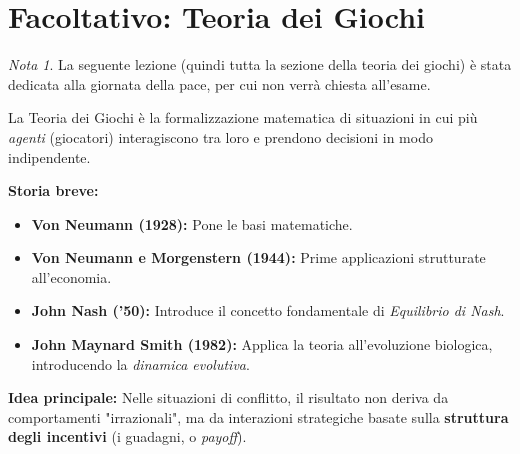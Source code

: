 \documentclass[openany]{book}
\theoremstyle{definition}
\theoremstyle{remark}
\newtheorem*{nota}{Nota}
\begin{document}
\section*{Facoltativo: Teoria dei Giochi}
\begin{nota}
    La seguente lezione (quindi tutta la sezione della teoria dei giochi) è stata dedicata alla giornata della pace, per cui non verrà chiesta all'esame.
\end{nota}
La Teoria dei Giochi è la formalizzazione matematica di situazioni in cui più \textit{agenti} (giocatori) interagiscono tra loro e prendono decisioni in modo indipendente.

\textbf{Storia breve:}
\begin{itemize}
    \item \textbf{Von Neumann (1928):} Pone le basi matematiche.
    \item \textbf{Von Neumann e Morgenstern (1944):} Prime applicazioni strutturate all'economia.
    \item \textbf{John Nash ('50):} Introduce il concetto fondamentale di \textit{Equilibrio di Nash}.
    \item \textbf{John Maynard Smith (1982):} Applica la teoria all'evoluzione biologica, introducendo la \textit{dinamica evolutiva}.
\end{itemize}

\textbf{Idea principale:}
Nelle situazioni di conflitto, il risultato non deriva da comportamenti "irrazionali", ma da interazioni strategiche basate sulla \textbf{struttura degli incentivi} (i guadagni, o \textit{payoff}).
\end{document}
